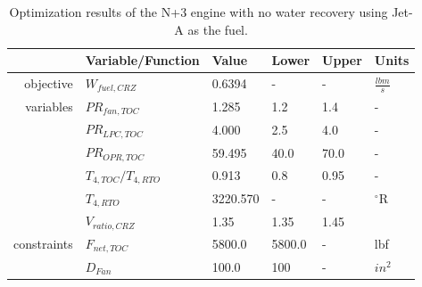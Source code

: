 \documentclass[conf]{new-aiaa}
\begin{document}
\begin{table}[h]
    \centering
    \caption{Optimization results of the N+3 engine with no water recovery using Jet-A as the fuel.
    }
    \small
    \renewcommand{\arraystretch}{1.2}
    \begin{tabular}{r l l l l l}
                    & Variable/Function     & Value    & Lower  & Upper & Units           \\
        \toprule
        objective   & $W_{fuel,CRZ}$        & 0.6394   & -      & -     & $\frac{lbm}{s}$ \\
        \hline
        variables   & $PR_{fan,TOC}$        & 1.285    & 1.2    & 1.4   & -               \\
                    & $PR_{LPC,TOC}$        & 4.000    & 2.5    & 4.0   & -               \\
                    & $PR_{OPR,TOC}$        & 59.495   & 40.0   & 70.0  & -               \\
                    & $T_{4,TOC}/T_{4,RTO}$ & 0.913    & 0.8    & 0.95  & -               \\
                    & $T_{4,RTO}$           & 3220.570 & -      & -     & $^\circ$R       \\
                    & $V_{ratio,CRZ}$       & 1.35     & 1.35   & 1.45  &                 \\
        \hline
        constraints & $F_{net,TOC}$         & 5800.0   & 5800.0 & -     & lbf             \\
                    & $D_{Fan}$             & 100.0    & 100    & -     & $in^2$          \\
        \bottomrule
    \end{tabular}
    \label{tab:res_thermo_opt_JetA}
\end{table}
\end{document}

